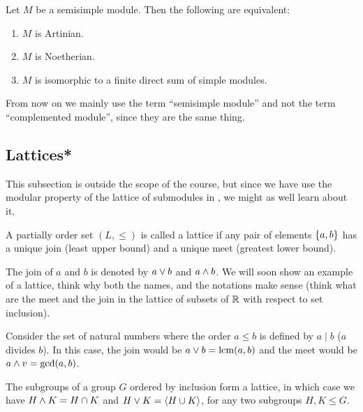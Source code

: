 \documentclass[11pt,a4paper]{article}
\begin{document}
\begin{exercise}
  Let $M$ be a semisimple module.
  Then the following are equivalent:
  \begin{enumerate}
    \item[(1)] $M$ is Artinian.
    \item[(2)] $M$ is Noetherian.
    \item[(3)] $M$ is isomorphic to a finite direct sum of simple modules.
  \end{enumerate}
\end{exercise}

\begin{remark}
  From now on we mainly use the term ``semisimple module'' and not the term
  ``complemented module'',
  since they are the same thing.
\end{remark}

\subsection{Lattices*}
\label{ssec:lattices}
This subsection is outside the scope of the course,
but since we have use the modular property of the lattice of submodules
in ,
we might as well learn about it.

\begin{definition}
  \label{def:lattice-poset}
  A partially order set $(L,\le)$ is called a lattice if any pair of elements $\left\{a,b\right\}$
  has a unique join (least upper bound) and a unique meet (greatest lower bound).
\end{definition}

\begin{remark}
  The join of $a$ and $b$ is denoted by $a \vee b$ and $a \wedge b$.
  We will soon show an example of a lattice,
  think why both the names, and the notations make sense (think what are
  the meet and the join in the lattice of subsets of $\mathbb{R}$ with respect to set
  inclusion).
\end{remark}

\begin{example}
  Consider the set of natural numbers where the order $a \le b$ is defined by
  $a \mid b$ ($a$ divides $b$).
  In this case, the join would be $a \vee b = \operatorname{lcm}(a,b)$
  and the meet would be $a \wedge v = \gcd(a,b)$.
\end{example}

\begin{example}
  The subgroups of a group $G$ ordered by inclusion form a lattice,
  in which case we have $H \wedge K = H \cap K$
  and $H \vee K = \langle H \cup K \rangle$, for any two subgroups $H,K \leqslant G$.
\end{example}
\end{document}
